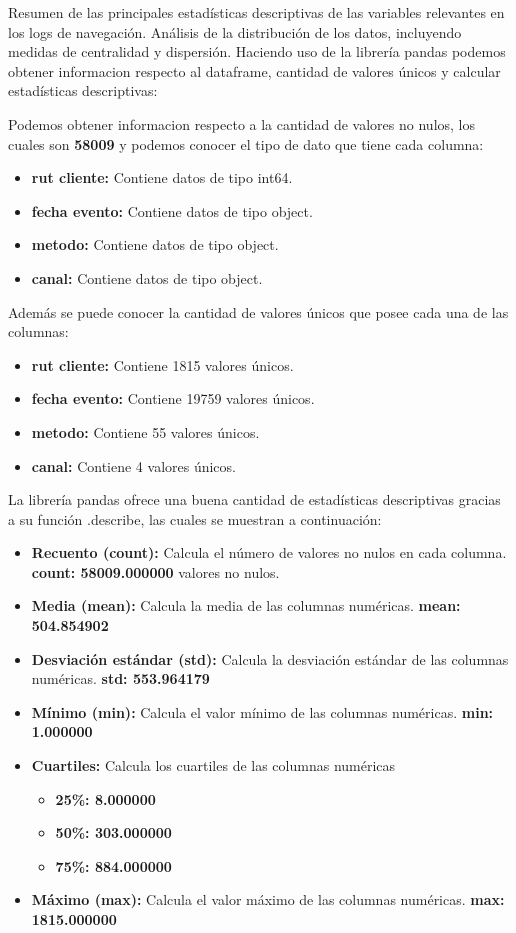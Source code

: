 Resumen de las principales estadísticas descriptivas de las variables relevantes en los logs de navegación.
Análisis de la distribución de los datos, incluyendo medidas de centralidad y dispersión.
Haciendo uso de la librería pandas podemos obtener informacion respecto al dataframe, cantidad de valores únicos y calcular estadísticas descriptivas:

Podemos obtener informacion respecto a la cantidad de valores no nulos, los cuales son \textbf{58009} y podemos conocer el tipo de dato que tiene cada columna:
\begin{itemize}
    \item \textbf{rut cliente:} Contiene datos de tipo int64.
    \item \textbf{fecha evento:} Contiene datos de tipo object.
    \item \textbf{metodo:} Contiene datos de tipo object.
    \item \textbf{canal:} Contiene datos de tipo object.
\end{itemize}

Además se puede conocer la cantidad de valores únicos que posee cada una de las columnas:
\begin{itemize}
    \item \textbf{rut cliente:} Contiene 1815 valores únicos.
    \item \textbf{fecha evento:} Contiene 19759 valores únicos.
    \item \textbf{metodo:} Contiene 55 valores únicos.
    \item \textbf{canal:} Contiene 4 valores únicos.
\end{itemize}

La librería pandas ofrece una buena cantidad de estadísticas descriptivas gracias a su función .describe, las cuales se muestran a continuación:
\begin{itemize}
    \item \textbf{Recuento (count):} Calcula el número de valores no nulos en cada columna. \textbf{count: 58009.000000} valores no nulos.
    \item \textbf{Media (mean):} Calcula la media de las columnas numéricas. \textbf{mean: 504.854902} 
    \item \textbf{Desviación estándar (std):} Calcula la desviación estándar de las columnas numéricas. \textbf{std: 553.964179}
    \item \textbf{Mínimo (min):} Calcula el valor mínimo de las columnas numéricas. \textbf{min: 1.000000}
    \item \textbf{Cuartiles:} Calcula los cuartiles de las columnas numéricas 
    \begin{itemize}
        \item \textbf{25\%: 8.000000}
        \item \textbf{50\%: 303.000000}
        \item \textbf{75\%: 884.000000}
    \end{itemize}
    \item \textbf{Máximo (max):} Calcula el valor máximo de las columnas numéricas. \textbf{max: 1815.000000}
\end{itemize}

